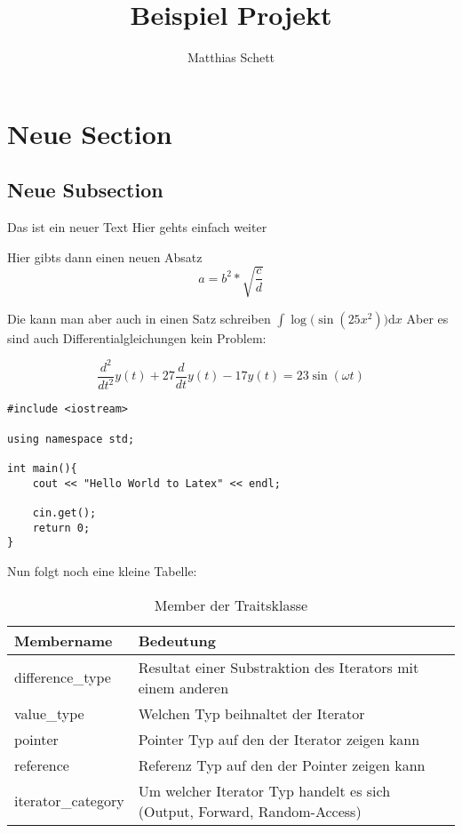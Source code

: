 \documentclass[a4paper, parskip=half]{scrartcl} %
\title{Beispiel Projekt} %
\author{Matthias Schett}
\date{}
\begin{document}

\maketitle  %
\tableofcontents %
\newpage %
\section{Neue Section} %
\subsection{Neue Subsection} %

Das ist ein neuer Text
Hier gehts einfach weiter

Hier gibts dann einen neuen Absatz
\[ a = b^2 * \sqrt{\frac{c}{d}} \] %

Die kann man aber auch in einen Satz schreiben $ \int{\log{(\sin{(25x^2))}} \mathrm{d}x} $ 
Aber es sind auch Differentialgleichungen kein Problem:

\[ \frac{d^2}{dt^2}y(t) + 27 \frac{d}{dt} y(t) - 17 y(t) = 23 \sin{(\omega t)} \]

\begin{lstlisting}
#include <iostream>

using namespace std;

int main(){
	cout << "Hello World to Latex" << endl;

	cin.get();
	return 0;
}
\end{lstlisting}

Nun folgt noch eine kleine Tabelle:

\begin{table}[htb]
	\centering
    \begin{tabular}{ | l | p{7cm} | }
        \hline
        Membername & Bedeutung \\ \hline \hline
        difference\_type & Resultat einer Substraktion des Iterators mit einem anderen \\ \hline
        value\_type & Welchen Typ beihnaltet der Iterator \\ \hline
        pointer & Pointer Typ auf den der Iterator zeigen kann \\ \hline
        reference & Referenz Typ auf den der Pointer zeigen kann \\ \hline
        iterator\_category & Um welcher Iterator Typ handelt es sich (Output, Forward, Random-Access) \\ \hline
    \end{tabular}
    \caption{Member der Traitsklasse}\label{table:traitsMember}
\end{table}
\end{document}

